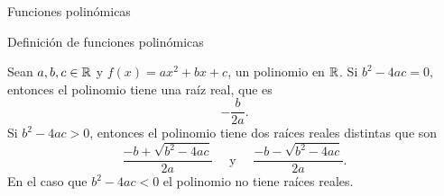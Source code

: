 \begin{chapter}{Funciones polinómicas}
\begin{section}{Definición de funciones polinómicas}
    \begin{ejemplo*}
        Sean $a,b,c \in \mathbb R$ y  $f(x) = ax^2 + bx + c$, un polinomio en $\mathbb R$.  Si $b^2 - 4 ac = 0$, entonces el polinomio tiene una raíz real, que es
        \begin{equation*}
            -\frac{b}{2a}.
        \end{equation*}
        Si $b^2 - 4 ac > 0$, entonces el polinomio tiene dos raíces reales distintas que son
        \begin{equation*}
            \frac{-b + \sqrt{b^2 - 4 ac}}{2a}\quad \text{ y }\quad \frac{-b - \sqrt{b^2 - 4 ac}}{2a}.
        \end{equation*}
        En el caso que $b^2 - 4 ac < 0$ el polinomio no tiene raíces reales.
    \end{ejemplo*}


\end{section}
\end{chapter}
